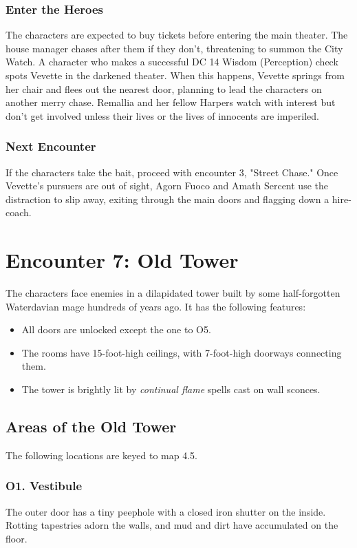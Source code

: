 \documentclass[10pt,a4paper,twoside,twocolumn,openany,nodeprecatedcode]{dndbook}
\begin{document}
\subsubsection{Enter the Heroes}
The characters are expected to buy tickets before entering the main theater. The house manager chases after them if they don't, threatening to summon the City Watch.
A character who makes a successful DC 14 Wisdom (Perception) check spots Vevette in the darkened theater. When this happens, Vevette springs from her chair and flees out the nearest door, planning to lead the characters on another merry chase. Remallia and her fellow Harpers watch with interest but don't get involved unless their lives or the lives of innocents are imperiled.
\subsubsection{Next Encounter}
If the characters take the bait, proceed with encounter 3, "Street Chase." Once Vevette's pursuers are out of sight, Agorn Fuoco and Amath Sercent use the distraction to slip away, exiting through the main doors and flagging down a hire-coach.
\section{Encounter 7: Old Tower}
The characters face enemies in a dilapidated tower built by some half-forgotten Waterdavian mage hundreds of years ago. It has the following features:
\begin{itemize}

\item All doors are unlocked except the one to O5.
\item The rooms have 15-foot-high ceilings, with 7-foot-high doorways connecting them.
\item The tower is brightly lit by \textit{continual flame} spells cast on wall sconces.
\end{itemize}


\subsection{Areas of the Old Tower}
The following locations are keyed to map 4.5.
\subsubsection{O1. Vestibule}
The outer door has a tiny peephole with a closed iron shutter on the inside. Rotting tapestries adorn the walls, and mud and dirt have accumulated on the floor.
\end{document}
